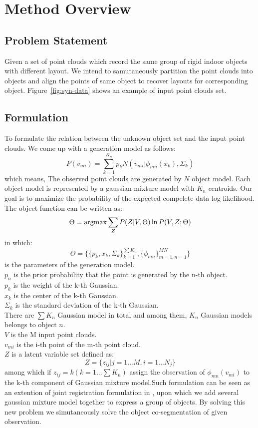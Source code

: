 \section{Method Overview}
\label{sec:method}
\subsection{Problem Statement}
Given a set of point clouds which record the same group of rigid indoor objects with different layout. We intend to samutaneously partition the point clouds into objects and align the points of same object to recover layouts for corresponding object. Figure~\ref{fig:syn-data} shows an example of input point clouds set.
\subsection{Formulation}
To formulate the relation between the unknown object set and the input point clouds. We come up with a generation model as follows:
\begin{equation}
\label{equ:model}
P(v_{mi})=\sum^{K_n}_{k=1}p_kN(v_{mi}|\phi_{mn}(x_k),\Sigma_k)
\end{equation}
which means,
The observed point clouds are generated by $N$ object model. 
Each object model is represented by a gaussian mixture model with $K_n$ centroids.
Our goal is to maximize the probability of the expected compelete-data log-likelihood. 
The object function can be written as:
\begin{equation}
\label{equ:obj0}
\Theta=\operatorname*{argmax}{\sum_ZP(Z|V,\Theta)\ln{P(V,Z;\Theta)}}
\end{equation}
in which:
$$\Theta=\{\{p_k,x_k,\Sigma_k\}_{k=1}^{\sum{K_n}},\{\phi_{mn}\}_{m=1,n=1}^{MN}\}$$
is the parameters of the generation model.\\
$p_n$ is the prior probability that the point is generated by the n-th object.\\
$p_k$ is the weight of the k-th Gaussian.\\
$x_k$ is the center of the k-th Gaussian.\\
$\Sigma_k$ is the standard deviation of the k-th Gaussian.\\
There are $\sum{K_n}$ Gaussian model in total and among them, $K_n$ Gaussian models belongs to object $n$.\\
$V$ is the M input point clouds.\\
$v_{mi}$ is the i-th point of the m-th point cloud.\\
$Z$ is a latent variable set defined as:\\
$$Z=\{z_{ij}|j=1...M,i=1...N_j\}$$
among which if $z_{ij}=k(k=1...\sum{K_n})$ assign the observation of $\phi_{mn}(v_{mi})$ to the k-th component of Gaussian mixture model.Such formulation can be seen as an extention of joint registration formulation in \cite{Evangelidis2014}, upon which we add several gaussian mixture model together to express a group of objects. By solving this new problem we simutaneously solve  the object co-segmentation of given observation.
